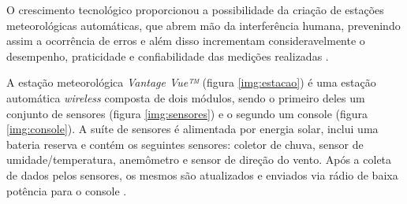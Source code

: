 O crescimento tecnológico proporcionou a possibilidade da criação de estações meteorológicas automáticas, que abrem mão da interferência humana, prevenindo assim a ocorrência de erros e além disso incrementam consideravelmente o desempenho, praticidade e confiabilidade das medições realizadas \cite{torres2015aquisicao}.  

A estação meteorológica \textit{Vantage Vue™} (figura \ref{img:estacao}) é uma estação automática \textit{wireless} composta de dois módulos, sendo o primeiro deles um conjunto de sensores (figura \ref{img:sensores}) e o segundo um console (figura \ref{img:console}). A suíte de sensores é alimentada por energia solar, inclui uma bateria reserva e contém os seguintes sensores: coletor de chuva, sensor de umidade/temperatura, anemômetro e sensor de direção do vento. Após a coleta de dados pelos sensores, os mesmos são atualizados e enviados via rádio de baixa potência para o console \cite{SITEDAVIS, VVINSTMANUAL}.

\newpage


